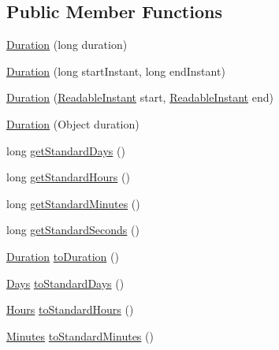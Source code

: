 \subsection*{Public Member Functions}
\begin{DoxyCompactItemize}
\item 
\hyperlink{classorg_1_1joda_1_1time_1_1_duration_a7f6bcc25858901798ea320474c92142d}{Duration} (long duration)
\item 
\hyperlink{classorg_1_1joda_1_1time_1_1_duration_a2a91223227df5a4390dca3229a640062}{Duration} (long start\-Instant, long end\-Instant)
\item 
\hyperlink{classorg_1_1joda_1_1time_1_1_duration_a6c00dd21279dbab69194e596b39969aa}{Duration} (\hyperlink{interfaceorg_1_1joda_1_1time_1_1_readable_instant}{Readable\-Instant} start, \hyperlink{interfaceorg_1_1joda_1_1time_1_1_readable_instant}{Readable\-Instant} end)
\item 
\hyperlink{classorg_1_1joda_1_1time_1_1_duration_a6144b126e6f6b7117e0fa78d331cb256}{Duration} (Object duration)
\item 
long \hyperlink{classorg_1_1joda_1_1time_1_1_duration_a1992c3a654ecb4e40b579c52bae02ac8}{get\-Standard\-Days} ()
\item 
long \hyperlink{classorg_1_1joda_1_1time_1_1_duration_a9cae0e362b42974d72ca8760afc227da}{get\-Standard\-Hours} ()
\item 
long \hyperlink{classorg_1_1joda_1_1time_1_1_duration_a01899392ee35ca26b16b6c9a5f4ed51d}{get\-Standard\-Minutes} ()
\item 
long \hyperlink{classorg_1_1joda_1_1time_1_1_duration_a57bb05bb7e3e59c5afdd11e06f568a93}{get\-Standard\-Seconds} ()
\item 
\hyperlink{classorg_1_1joda_1_1time_1_1_duration}{Duration} \hyperlink{classorg_1_1joda_1_1time_1_1_duration_ab2ffb36a697a390946b0cf3657e762a6}{to\-Duration} ()
\item 
\hyperlink{classorg_1_1joda_1_1time_1_1_days}{Days} \hyperlink{classorg_1_1joda_1_1time_1_1_duration_a02129e096a0702b8bb478415b5fcf03e}{to\-Standard\-Days} ()
\item 
\hyperlink{classorg_1_1joda_1_1time_1_1_hours}{Hours} \hyperlink{classorg_1_1joda_1_1time_1_1_duration_a025cb9e945f61a07ca9ce979eff39c2a}{to\-Standard\-Hours} ()
\item 
\hyperlink{classorg_1_1joda_1_1time_1_1_minutes}{Minutes} \hyperlink{classorg_1_1joda_1_1time_1_1_duration_aa5c4d3d4e055e1f57d2a7bbcb5f163f6}{to\-Standard\-Minutes} ()
\item 

\end{DoxyCompactItemize}
